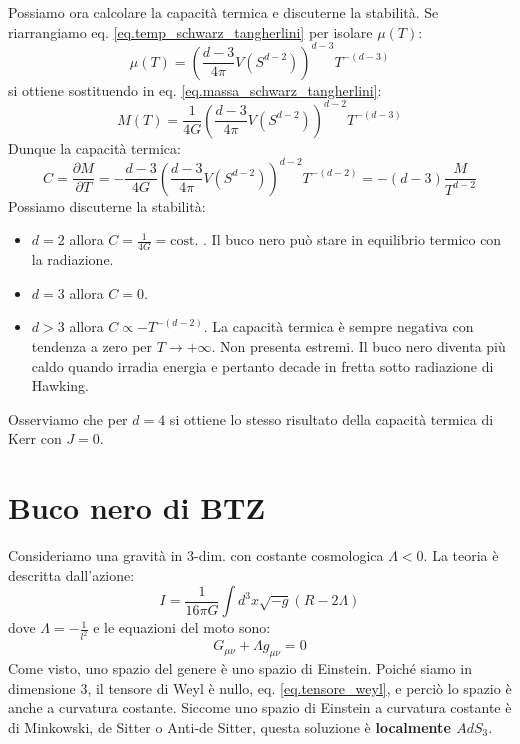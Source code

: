 Possiamo ora calcolare la capacità termica e discuterne la stabilità. Se riarrangiamo eq. \ref{eq.temp_schwarz_tangherlini} per isolare $\mu(T)$:
\begin{equation*}
    \mu(T) = \left( \frac{d-3}{4\pi}V(S^{d-2})\right)^{d-3}T^{-(d-3)}
\end{equation*}
si ottiene sostituendo in eq. \ref{eq.massa_schwarz_tangherlini}:
\begin{equation*}
    M(T) = \frac{1}{4G}\left( \frac{d-3}{4\pi}V(S^{d-2})\right)^{d-2}T^{-(d-3)}
\end{equation*}
Dunque la capacità termica:
\begin{equation}
    C =  \frac{\partial M}{\partial T} = - \frac{d-3}{4G}\left( \frac{d-3}{4\pi}V(S^{d-2})\right)^{d-2}T^{-(d-2)} = - (d-3) \frac{M}{T^{d-2}} \label{eq.cap_termica_schwarz_tangh}
\end{equation}
Possiamo discuterne la stabilità:
\begin{itemize}
    \item $d=2$ allora $C = \frac{1}{4G}= \textrm{cost.}$ . Il buco nero può stare in equilibrio termico con la radiazione.
    \item $d= 3$ allora $C = 0$.
    \item $d > 3$ allora $C \propto - T^{-(d-2)}$. La capacità termica è sempre negativa con tendenza a zero per $T \rightarrow + \infty$. Non presenta estremi.  Il buco nero diventa più caldo quando irradia energia e pertanto decade in fretta sotto radiazione di Hawking.
\end{itemize}
Osserviamo che per $d=4$ si ottiene lo stesso risultato della capacità termica di Kerr con $J=0$.
\section{Buco nero di BTZ}
Consideriamo una gravità in 3-dim. con costante cosmologica $\Lambda < 0$. La teoria è descritta dall'azione:
\begin{equation*}
    I= \frac{1}{16\pi G} \int d^3x \sqrt{-g}( R - 2\Lambda )   
\end{equation*}
dove $\Lambda = - \frac{1}{l^2}$ e le equazioni del moto sono:
\begin{equation*}
    G_{\mu\nu} + \Lambda g_{\mu\nu} = 0
\end{equation*}
Come visto, uno spazio del genere è uno spazio di Einstein. Poiché siamo in dimensione 3, il tensore di Weyl è nullo, eq. \ref{eq.tensore_weyl}, e perciò lo spazio è anche a curvatura costante. Siccome uno spazio di Einstein a curvatura costante è di Minkowski, de Sitter o Anti-de Sitter, questa soluzione è \textbf{localmente $AdS_3$}.


